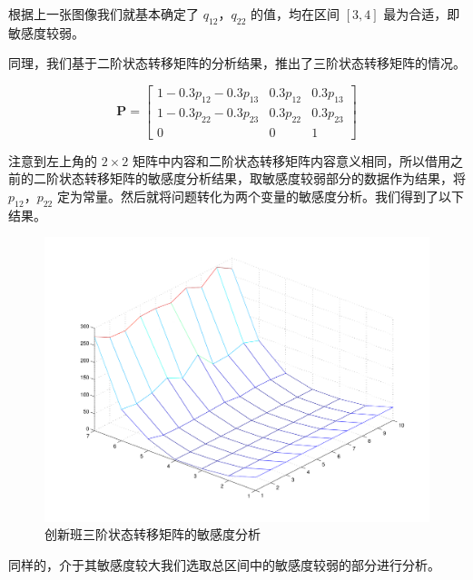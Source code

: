 \documentclass[a4paper]{article}
\let\mat\boldsymbol %
\begin{document}
  根据上一张图像我们就基本确定了 $q_{12}$，$q_{22}$ 的值，均在区间 $[3,4]$ 最为合适，即敏感度较弱。

  同理，我们基于二阶状态转移矩阵的分析结果，推出了三阶状态转移矩阵的情况。

  \begin{equation}
  \mat{P}=
  \begin{bmatrix}
  1-0.3p_{12}-0.3p_{13} & 0.3p_{12} & 0.3p_{13} \\
  1-0.3p_{22}-0.3p_{23} & 0.3p_{22} & 0.3p_{23} \\
  0 & 0 & 1
  \end{bmatrix}
  \end{equation}

  注意到左上角的 $2\times2$ 矩阵中内容和二阶状态转移矩阵内容意义相同，所以借用之前的二阶状态转移矩阵的敏感度分析结果，取敏感度较弱部分的数据作为结果，将 $p_{12}$，$p_{22}$ 定为常量。然后就将问题转化为两个变量的敏感度分析。我们得到了以下结果。

  \begin{figure}[H]
  \centerline{\includegraphics[scale=0.5]{inno3.pdf}}
  \caption{创新班三阶状态转移矩阵的敏感度分析}
  \end{figure}

  同样的，介于其敏感度较大我们选取总区间中的敏感度较弱的部分进行分析。
\end{document}

